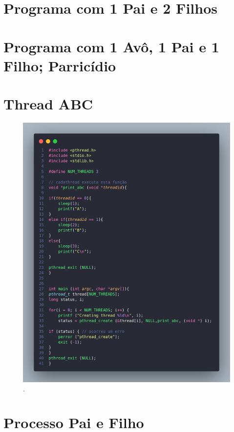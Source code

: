 \documentclass[
	12pt,				%
	openright,			%
	oneside,			%
	a4paper,			%
	chapter=TITLE,		%
	english,			%
	french,				%
	spanish,			%
	brazil				%
	]{abntex2}
\theoremstyle{definition}
\begin{document}
\section{Programa com 1 Pai e 2 Filhos}

\section{Programa com 1 Avô, 1 Pai e 1 Filho; Parricídio}

\section{Thread ABC}

\begin{figure}
    \centering
    \includegraphics[width=1.0\textwidth]{imagens/processos_4.png}
	\caption{.}
	\label{fig:}
\end{figure}
\section{Processo Pai e Filho}
\end{document}
